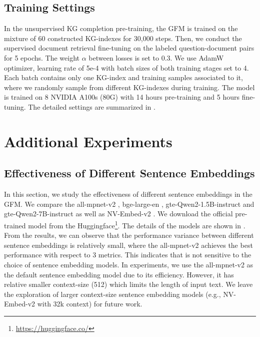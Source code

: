 \subsection{Training Settings}\label{app:training_settings}
In the unsupervised KG completion pre-training, the GFM is trained on the mixture of 60 constructed KG-indexes for 30,000 steps. Then, we conduct the supervised document retrieval fine-tuning on the labeled question-document pairs for 5 epochs. The weight $\alpha$ between losses is set to 0.3. We use AdamW optimizer, learning rate of 5e-4 with batch sizes of both training stages set to 4. Each batch contains only one KG-index and training samples associated to it, where we randomly sample from different KG-indexes during training. The model is trained on 8 NVIDIA A100s (80G) with 14 hours pre-training and 5 hours fine-tuning. The detailed settings are summarized in .



\section{Additional Experiments}\label{app:additional_experiments}


\subsection{Effectiveness of Different Sentence Embeddings}\label{app:text_embeddings}

In this section, we study the effectiveness of different sentence embeddings in the GFM. We compare the all-mpnet-v2 \cite{all-mpnet-v2}, bge-large-en \cite{bge_embedding}, gte-Qwen2-1.5B-instruct and gte-Qwen2-7B-instruct \cite{li2023towards} as well as NV-Embed-v2 \cite{lee2024nv}. We download the official pre-trained model from the Huggingface\footnote{\url{https://huggingface.co/}}. The details of the models are shown in . From the results, we can  observe that the performance variance between different sentence embeddings is relatively small, where the all-mpnet-v2 achieves the best performance with respect to 3 metrics. This indicates that \ourmethod is not sensitive to the choice of sentence embedding models. In experiments, we use the all-mpnet-v2 as the default sentence embedding model due to its efficiency. However, it has relative smaller context-size (512) which limits the length of input text. We leave the exploration of larger context-size sentence embedding models (e.g., NV-Embed-v2 with 32k context) for future work.

